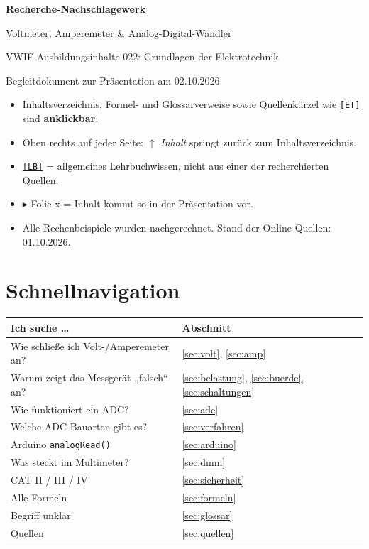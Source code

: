 \documentclass[11pt,a4paper]{article}
\newcommand{\q}[1]{\hyperlink{src:#1}{\textcolor{quelle}{\texttt{\footnotesize[#1]}}}}
\newcommand{\folie}[1]{\textcolor{akzent}{\footnotesize\textsf{$\blacktriangleright$ Folie #1}}}
\begin{document}
\begin{titlepage}
\centering\vspace*{30mm}
{\Huge\bfseries\color{akzent} Recherche-Nachschlagewerk\par}
\vspace{6mm}
{\LARGE Voltmeter, Amperemeter \& Analog-Digital-Wandler\par}
\vspace{12mm}
{\large VWIF \textbar{} Ausbildungsinhalte 022: Grundlagen der Elektrotechnik\par}
\vspace{4mm}
{\large Begleitdokument zur Präsentation am 02.10.2026\par}
\vfill
\begin{hinweis}
\begin{itemize}
  \item Inhaltsverzeichnis, Formel- und Glossarverweise sowie Quellenkürzel wie \q{ET} sind \textbf{anklickbar}.
  \item Oben rechts auf jeder Seite: \emph{$\uparrow$ Inhalt} springt zurück zum Inhaltsverzeichnis.
  \item \q{LB} = allgemeines Lehrbuchwissen, nicht aus einer der recherchierten Quellen.
  \item \folie{x} = Inhalt kommt so in der Präsentation vor.
  \item Alle Rechenbeispiele wurden nachgerechnet. Stand der Online-Quellen: 01.10.2026.
\end{itemize}
\end{hinweis}
\end{titlepage}

\label{toc}
\tableofcontents
\vspace{6mm}

\section*{Schnellnavigation}
\begin{tabularx}{\textwidth}{@{}Xl@{}}
\toprule
Ich suche \dots & Abschnitt\\ \midrule
Wie schließe ich Volt-/Amperemeter an? & \ref{sec:volt}, \ref{sec:amp}\\
Warum zeigt das Messgerät „falsch“ an? & \ref{sec:belastung}, \ref{sec:buerde}, \ref{sec:schaltungen}\\
Wie funktioniert ein ADC? & \ref{sec:adc}\\
Welche ADC-Bauarten gibt es? & \ref{sec:verfahren}\\
Arduino \texttt{analogRead()} & \ref{sec:arduino}\\
Was steckt im Multimeter? & \ref{sec:dmm}\\
CAT II / III / IV & \ref{sec:sicherheit}\\
Alle Formeln & \ref{sec:formeln}\\
Begriff unklar & \ref{sec:glossar}\\
Quellen & \ref{sec:quellen}\\
\bottomrule
\end{tabularx}
\end{document}
